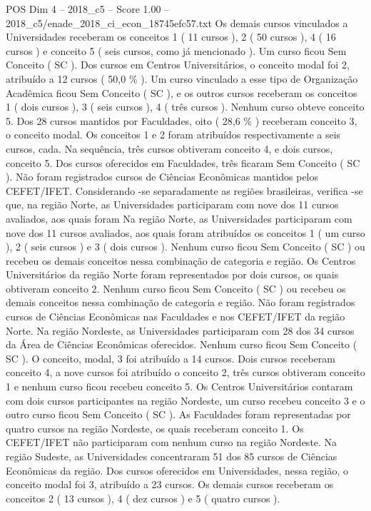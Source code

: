 \begin{textsample}{POS Dim 4 – 2018\_c5 – Score 1.00 – 2018\_c5/enade\_2018\_ci\_econ\_18745efc57.txt}
Os demais cursos vinculados a Universidades receberam os conceitos 1 ( 11 cursos ), 2 ( 50 cursos ), 4 ( 16 cursos ) e conceito 5 ( seis cursos, como já mencionado ).
Um curso ficou Sem Conceito ( SC ).
Dos cursos em Centros Universitários, o conceito modal foi 2, atribuído a 12 cursos ( 50,0 \% ).
Um curso vinculado a esse tipo de Organização Acadêmica ficou Sem Conceito ( SC ), e os outros cursos receberam os conceitos 1 ( dois cursos ), 3 ( seis cursos ), 4 ( três cursos ).
Nenhum curso obteve conceito 5.
Dos 28 cursos mantidos por Faculdades, oito ( 28,6 \% ) receberam conceito 3, o conceito modal.
Os conceitos 1 e 2 foram atribuídos respectivamente a seis cursos, cada.
Na sequência, três cursos obtiveram conceito 4, e dois cursos, conceito 5.
Dos cursos oferecidos em Faculdades, três ficaram Sem Conceito ( SC ).
Não foram registrados cursos de Ciências Econômicas mantidos pelos CEFET/IFET.
Considerando -se separadamente as regiões brasileiras, verifica -se que, na região Norte, as Universidades participaram com nove dos 11 cursos avaliados, aos quais foram Na região Norte, as Universidades participaram com nove dos 11 cursos avaliados, aos quais foram atribuídos os conceitos 1 ( um curso ), 2 ( seis cursos ) e 3 ( dois cursos ).
Nenhum curso ficou Sem Conceito ( SC ) ou recebeu os demais conceitos nessa combinação de categoria e região.
Os Centros Universitários da região Norte foram representados por dois cursos, os quais obtiveram conceito 2.
Nenhum curso ficou Sem Conceito ( SC ) ou recebeu os demais conceitos nessa combinação de categoria e região.
Não foram registrados cursos de Ciências Econômicas nas Faculdades e nos CEFET/IFET da região Norte.
Na região Nordeste, as Universidades participaram com 28 dos 34 cursos da Área de Ciências Econômicas oferecidos.
Nenhum curso ficou Sem Conceito ( SC ).
O conceito, modal, 3 foi atribuído a 14 cursos.
Dois cursos receberam conceito 4, a nove cursos foi atribuído o conceito 2, três cursos obtiveram conceito 1 e nenhum curso ficou recebeu conceito 5.
Os Centros Universitários contaram com dois cursos participantes na região Nordeste, um curso recebeu conceito 3 e o outro curso ficou Sem Conceito ( SC ).
As Faculdades foram representadas por quatro cursos na região Nordeste, os quais receberam conceito 1.
Os CEFET/IFET não participaram com nenhum curso na região Nordeste.
Na região Sudeste, as Universidades concentraram 51 dos 85 cursos de Ciências Econômicas da região.
Dos cursos oferecidos em Universidades, nessa região, o conceito modal foi 3, atribuído a 23 cursos.
Os demais cursos receberam os conceitos 2 ( 13 cursos ), 4 ( dez cursos ) e 5 ( quatro cursos ).

\end{textsample}
